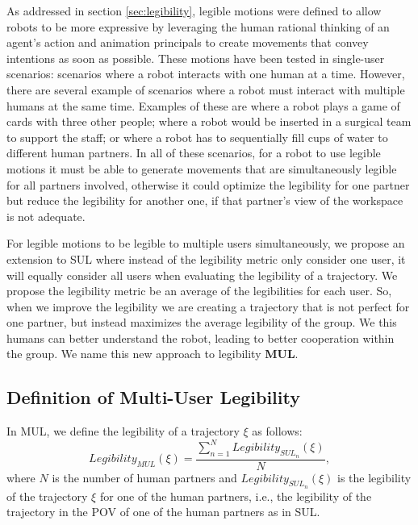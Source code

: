 \documentclass[letterpaper, 10 pt, conference]{ieeeconf}
\begin{document}
As addressed in section \ref{sec:legibility}, legible motions were defined to allow robots to be more expressive by leveraging the human rational thinking of an agent's action and animation principals to create movements that convey intentions as soon as possible. These motions have been tested in single-user scenarios: scenarios where a robot interacts with one human at a time. However, there are several example of scenarios where a robot must interact with multiple humans at the same time. Examples of these are \cite{correia2017social} where a robot plays a game of cards with three other people; \cite{kaplan2016icra} where a robot would be inserted in a surgical team to support the staff; or \cite{faria2017iros} where a robot has to sequentially fill cups of water to different human partners. In all of these scenarios, for a robot to use legible motions it must be able to generate movements that are simultaneously legible for all partners involved, otherwise it could optimize the legibility for one partner but reduce the legibility for another one, if that partner's view of the workspace is not adequate.

For legible motions to be legible to multiple users simultaneously, we propose an extension to \ac{SUL} where instead of the legibility metric only consider one user, it will equally consider all users when evaluating the legibility of a trajectory. We propose the legibility metric be an average of the legibilities for each user. So, when we improve the legibility we are creating a trajectory that is not perfect for one partner, but instead maximizes the average legibility of the group. We this humans can better understand the robot, leading to better cooperation within the group. We name this new approach to legibility \textbf{\ac{MUL}}.

\subsection{Definition of Multi-User Legibility}
\label{subsec:multi-user-legibility-math}

In \ac{MUL}, we define the legibility of a trajectory $\xi$ as follows:
%
\begin{equation}
    \label{eq:4}
    Legibility_{MUL}(\xi) =  \frac{ \sum_{n=1}^{N} Legibility_{SUL_n}(\xi)}{N},
\end{equation}
%
where $N$ is the number of human partners and $Legibility_{SUL_n}(\xi)$ is the legibility of the trajectory $\xi$ for one of the human partners, i.e., the legibility of the trajectory in the \ac{POV} of one of the human partners as in \ac{SUL}.
\end{document}
